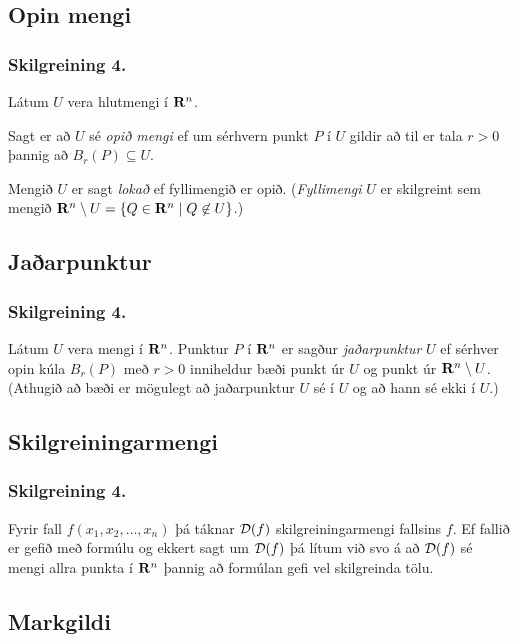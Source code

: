 




\subsection{Opin mengi}
 \subsubsection{Skilgreining 4.}
Látum $U$ vera hlutmengi í $\mbox{${\bf R}^n$}$.

Sagt er að $U$ sé {\em opið mengi} ef um sérhvern punkt $P$ í $U$ gildir að til er tala $r>0$ þannig að $B_r(P)\subseteq U$.

Mengið $U$ er sagt {\em lokað} ef fyllimengið er opið.  ({\em Fyllimengi} $U$ er skilgreint sem mengið 
$\mbox{${\bf R}^n$}\setminus U=\{Q\in \mbox{${\bf R}^n$}\mid Q\mbox{$\;\not\in\;$} U\}$.)




\subsection{Jaðarpunktur}
 \subsubsection{Skilgreining 4.}
Látum $U$ vera mengi í $\mbox{${\bf R}^n$}$.  Punktur $P$ í $\mbox{${\bf R}^n$}$ er sagður {\em jaðarpunktur} $U$ ef sérhver opin kúla $B_r(P)$ með $r>0$ inniheldur bæði punkt úr $U$ og punkt úr $\mbox{${\bf R}^n$}\setminus U$.   (Athugið að bæði er mögulegt að jaðarpunktur $U$ sé í $U$ og að hann sé ekki í $U$.)



\subsection{Skilgreiningarmengi}
 \subsubsection{Skilgreining 4.}
Fyrir fall $f(x_1,x_2,\ldots,x_n)$ þá táknar ${\cal D}(f)$ skilgreiningarmengi fallsins $f$.
Ef fallið er gefið með formúlu og ekkert sagt um ${\cal D}(f)$ þá lítum við svo á að ${\cal D}(f)$ sé mengi allra punkta í $\mbox{${\bf R}^n$}$ þannig að formúlan gefi vel skilgreinda tölu.




\subsection{Markgildi}
